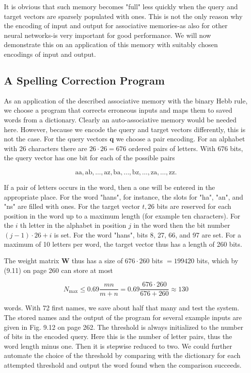 \documentclass[10pt]{book}
\begin{document}
It is obvious that such memory becomes "full" less quickly when the query and target vectors are sparsely populated with ones. This is not the only reason why the encoding of input and output for associative memories-as also for other neural networks-is very important for good performance. We will now demonstrate this on an application of this memory with suitably chosen encodings of input and output.

\subsection{A Spelling Correction Program}
As an application of the described associative memory with the binary Hebb rule, we choose a program that corrects erroneous inputs and maps them to saved words from a dictionary. Clearly an auto-associative memory would be needed here. However, because we encode the query and target vectors differently, this is not the case. For the query vectors $\boldsymbol{q}$ we choose a pair encoding. For an alphabet with 26 characters there are $26 \cdot 26=676$ ordered pairs of letters. With 676 bits, the query vector has one bit for each of the possible pairs

$$
\mathrm{aa}, \mathrm{ab}, \ldots, \mathrm{az}, \mathrm{ba}, \ldots, \mathrm{bz}, \ldots, \mathrm{za}, \ldots, \mathrm{zz} .
$$

If a pair of letters occurs in the word, then a one will be entered in the appropriate place. For the word "hans", for instance, the slots for "ha", "an", and "ns" are filled with ones. For the target vector $t, 26$ bits are reserved for each position in the word up to a maximum length (for example ten characters). For the $i$ th letter in the alphabet in position $j$ in the word then the bit number $(j-1) \cdot 26+i$ is set. For the word "hans", bits 8, 27, 66, and 97 are set. For a maximum of 10 letters per word, the target vector thus has a length of 260 bits.

The weight matrix $\boldsymbol{W}$ thus has a size of $676 \cdot 260$ bits $=199420$ bits, which by (9.11) on page 260 can store at most

$$
N_{\max } \leq 0.69 \frac{m n}{m+n}=0.69 \frac{676 \cdot 260}{676+260} \approx 130
$$

words. With 72 first names, we save about half that many and test the system. The stored names and the output of the program for several example inputs are given in Fig. 9.12 on page 262. The threshold is always initialized to the number of bits in the encoded query. Here this is the number of letter pairs, thus the word length minus one. Then it is stepwise reduced to two. We could further automate the choice of the threshold by comparing with the dictionary for each attempted threshold and output the word found when the comparison succeeds.
\end{document}
